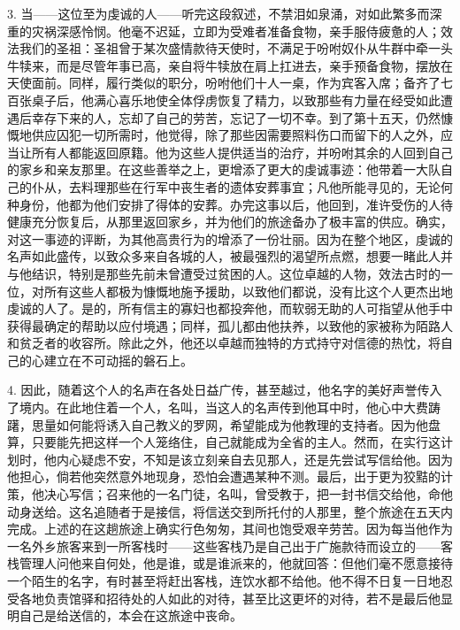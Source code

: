 3. 当——这位至为虔诚的人——听完这段叙述，不禁泪如泉涌，对如此繁多而深重的灾祸深感怜悯。他毫不迟延，立即为受难者准备食物，亲手服侍疲惫的人；效法我们的圣祖：圣祖曾于某次盛情款待天使时，不满足于吩咐奴仆从牛群中牵一头牛犊来，而是尽管年事已高，亲自将牛犊放在肩上扛进去，亲手预备食物，摆放在天使面前。同样，履行类似的职分，吩咐他们十人一桌，作为宾客入席；备齐了七百张桌子后，他满心喜乐地使全体俘虏恢复了精力，以致那些有力量在经受如此遭遇后幸存下来的人，忘却了自己的劳苦，忘记了一切不幸。到了第十五天，仍然慷慨地供应囚犯一切所需时，他觉得，除了那些因需要照料伤口而留下的人之外，应当让所有人都能返回原籍。他为这些人提供适当的治疗，并吩咐其余的人回到自己的家乡和亲友那里。在这些善举之上，更增添了更大的虔诚事迹：他带着一大队自己的仆从，去料理那些在行军中丧生者的遗体安葬事宜；凡他所能寻见的，无论何种身份，他都为他们安排了得体的安葬。办完这事以后，他回到，准许受伤的人待健康充分恢复后，从那里返回家乡，并为他们的旅途备办了极丰富的供应。确实，对这一事迹的评断，为其他高贵行为的增添了一份壮丽。因为在整个地区，虔诚的名声如此盛传，以致众多来自各城的人，被最强烈的渴望所点燃，想要一睹此人并与他结识，特别是那些先前未曾遭受过贫困的人。这位卓越的人物，效法古时的一位，对所有这些人都极为慷慨地施予援助，以致他们都说，没有比这个人更杰出地虔诚的人了。是的，所有信主的寡妇也都投奔他，而软弱无助的人可指望从他手中获得最确定的帮助以应付境遇；同样，孤儿都由他扶养，以致他的家被称为陌路人和贫乏者的收容所。除此之外，他还以卓越而独特的方式持守对信德的热忱，将自己的心建立在不可动摇的磐石上。\par

4. 因此，随着这个人的名声在各处日益广传，甚至越过，他名字的美好声誉传入了境内。在此地住着一个人，名叫，当这人的名声传到他耳中时，他心中大费踌躇，思量如何能将诱入自己教义的罗网，希望能成为他教理的支持者。因为他盘算，只要能先把这样一个人笼络住，自己就能成为全省的主人。然而，在实行这计划时，他内心疑虑不安，不知是该立刻亲自去见那人，还是先尝试写信给他。因为他担心，倘若他突然意外地现身，恐怕会遭遇某种不测。最后，出于更为狡黠的计策，他决心写信；召来他的一名门徒，名叫，曾受教于，把一封书信交给他，命他动身送给。这名追随者于是接信，将信送交到所托付的人那里，整个旅途在五天内完成。上述的在这趟旅途上确实行色匆匆，其间也饱受艰辛劳苦。因为每当他作为一名外乡旅客来到一所客栈时——这些客栈乃是自己出于广施款待而设立的——客栈管理人问他来自何处，他是谁，或是谁派来的，他就回答：但他们毫不愿意接待一个陌生的名字，有时甚至将赶出客栈，连饮水都不给他。他不得不日复一日地忍受各地负责馆驿和招待处的人如此的对待，甚至比这更坏的对待，若不是最后他显明自己是给送信的，本会在这旅途中丧命。\par

